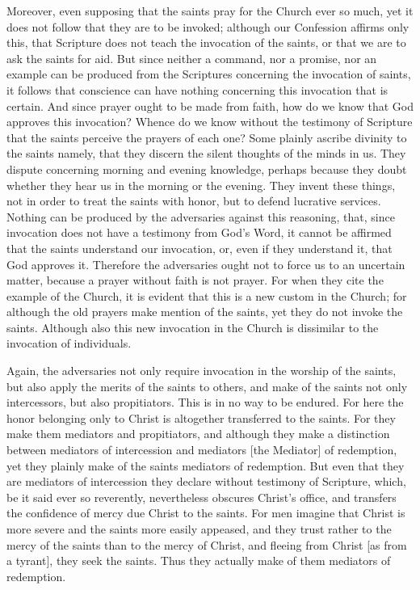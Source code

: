 Moreover, even supposing that the saints pray for the Church ever so
much, yet it does not follow that they are to be invoked; although
our Confession affirms only this, that Scripture does not teach the
invocation of the saints, or that we are to ask the saints for aid.
But since neither a command, nor a promise, nor an example can be
produced from the Scriptures concerning the invocation of saints, it
follows that conscience can have nothing concerning this invocation
that is certain.  And since prayer ought to be made from faith, how
do we know that God approves this invocation?  Whence do we know
without the testimony of Scripture that the saints perceive the
prayers of each one?  Some plainly ascribe divinity to the saints
namely, that they discern the silent thoughts of the minds in us.
They dispute concerning morning and evening knowledge, perhaps
because they doubt whether they hear us in the morning or the evening.
They invent these things, not in order to treat the saints with
honor, but to defend lucrative services.  Nothing can be produced by
the adversaries against this reasoning, that, since invocation does
not have a testimony from God's Word, it cannot be affirmed that the
saints understand our invocation, or, even if they understand it,
that God approves it.  Therefore the adversaries ought not to force
us to an uncertain matter, because a prayer without faith is not
prayer.  For when they cite the example of the Church, it is evident
that this is a new custom in the Church; for although the old prayers
make mention of the saints, yet they do not invoke the saints.
Although also this new invocation in the Church is dissimilar to the
invocation of individuals.

Again, the adversaries not only require invocation in the worship of
the saints, but also apply the merits of the saints to others, and
make of the saints not only intercessors, but also propitiators.
This is in no way to be endured.  For here the honor belonging only
to Christ is altogether transferred to the saints.  For they make
them mediators and propitiators, and although they make a distinction
between mediators of intercession and mediators [the Mediator] of
redemption, yet they plainly make of the saints mediators of
redemption.  But even that they are mediators of intercession they
declare without testimony of Scripture, which, be it said ever so
reverently, nevertheless obscures Christ's office, and transfers the
confidence of mercy due Christ to the saints.  For men imagine that
Christ is more severe and the saints more easily appeased, and they
trust rather to the mercy of the saints than to the mercy of Christ,
and fleeing from Christ [as from a tyrant], they seek the saints.
Thus they actually make of them mediators of redemption.

